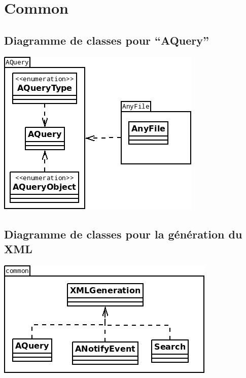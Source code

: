 \section{Common}\label{common}

\subsection{Diagramme de classes pour \enquote{AQuery}}
\begin{center}
\includegraphics[scale=0.6]{"images/diagramme_classes_aquery"}
\end{center}

\subsection{Diagramme de classes pour la génération du XML}
\begin{center}
\includegraphics[scale=0.6]{"images/diagramme_classes_xmlgeneration"}
\end{center}

\newpage
